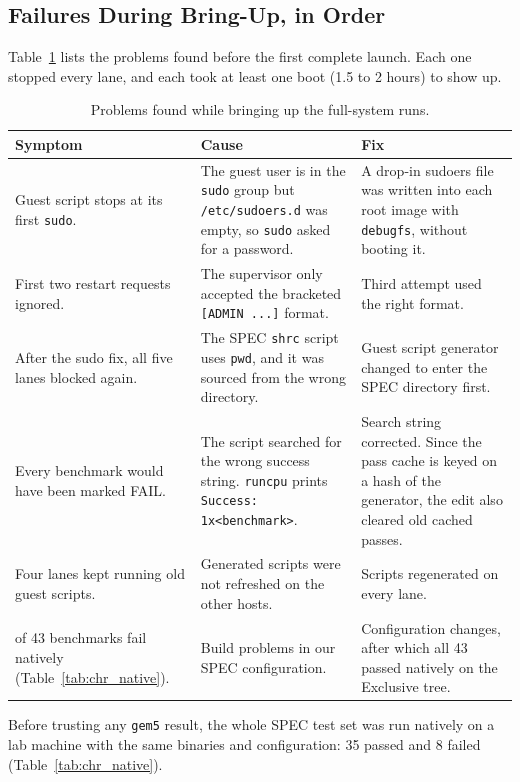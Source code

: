 \subsection{Failures During Bring-Up, in Order}
Table~\ref{tab:chr_bringup} lists the problems found before the first complete launch. Each one stopped every lane, and each took at least one boot (1.5 to 2 hours) to show up.

\begin{table}[htbp]
\centering
\small
\caption{Problems found while bringing up the full-system runs.}
\label{tab:chr_bringup}
\begin{tabularx}{\textwidth}{>{\raggedright\arraybackslash}p{3.3cm} X X}
\toprule
\textbf{Symptom} & \textbf{Cause} & \textbf{Fix} \\
\midrule
Guest script stops at its first \texttt{sudo}. & The guest user is in the \texttt{sudo} group but \texttt{/etc/sudoers.d} was empty, so \texttt{sudo} asked for a password. & A drop-in sudoers file was written into each root image with \texttt{debugfs}, without booting it. \\
First two restart requests ignored. & The supervisor only accepted the bracketed \texttt{[ADMIN ...]} format. & Third attempt used the right format. \\
After the sudo fix, all five lanes blocked again. & The SPEC \texttt{shrc} script uses \texttt{pwd}, and it was sourced from the wrong directory. & Guest script generator changed to enter the SPEC directory first. \\
Every benchmark would have been marked FAIL. & The script searched for the wrong success string. \texttt{runcpu} prints \texttt{Success: 1x<benchmark>}. & Search string corrected. Since the pass cache is keyed on a hash of the generator, the edit also cleared old cached passes. \\
Four lanes kept running old guest scripts. & Generated scripts were not refreshed on the other hosts. & Scripts regenerated on every lane. \\
8 of 43 benchmarks fail natively (Table~\ref{tab:chr_native}). & Build problems in our SPEC configuration. & Configuration changes, after which all 43 passed natively on the Exclusive tree. \\
\bottomrule
\end{tabularx}
\end{table}

Before trusting any \texttt{gem5} result, the whole SPEC test set was run natively on a lab machine with the same binaries and configuration: 35 passed and 8 failed (Table~\ref{tab:chr_native}).

